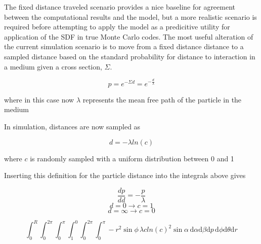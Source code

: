 

The fixed distance traveled scenario provides a nice baseline for agreement
between the computational results and the model, but a more realistic scenario
is required before attempting to apply the model as a predicitive utility for
application of the SDF in true Monte Carlo codes. The most useful alteration of
the current simulation scenario is to move from a fixed distance distance to a
sampled distance based on the standard probability for distance to interaction
in a medium given a cross section, $\Sigma$.

$$ p = e^{-\Sigma d} = e^{-\frac{d}{\lambda}} $$

where in this case now $\lambda$ represents the mean free path of the particle in the medium

In simulation, distances are now sampled as

$$ d = -\lambda ln(c) $$

where $c$ is randomly sampled with a uniform distribution between 0 and 1

Inserting this definition for the particle distance into the integrals above
gives

$$ \frac{dp}{dd} = -\frac{p}{\lambda} $$
$$ d = 0 \rightarrow c = 1 $$
$$ d = \infty \rightarrow c = 0 $$

$$ \int_{0}^{R}\int_{0}^{2\pi}\int_{0}^{\pi}\int_{1}^{0}\int_{0}^{2\pi}\int_{0}^{\pi}
-r^2\sin{\phi} \, \lambda c ln(c)^2 \sin{\alpha} \, \mathrm{d}\alpha \mathrm{d}\beta \mathrm{d}p \, \mathrm{d}\phi
\mathrm{d}\theta \mathrm{d}r $$

